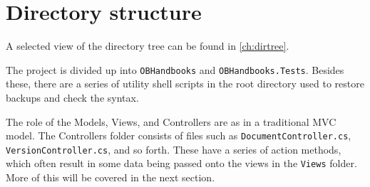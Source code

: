 \section{Directory structure}
A selected view of the directory tree can be found in \cref{ch:dirtree}.

The project is divided up into \texttt{OBHandbooks} and \texttt{OBHandbooks.Tests}.
Besides these, there are a series of utility shell scripts in the root directory used to restore backups and check the syntax.

The role of the Models, Views, and Controllers are as in a traditional MVC model.
The Controllers folder consists of files such as \texttt{DocumentController.cs}, \texttt{VersionController.cs}, and so forth.
These have a series of action methods, which often result in some data being passed onto the views in the \texttt{Views} folder.
More of this will be covered in the next section.
